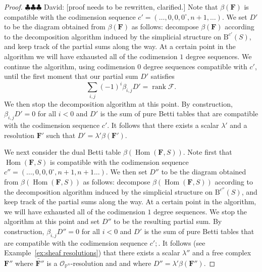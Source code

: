 \documentclass[12pt]{amsart}
\theoremstyle{definition}
\theoremstyle{remark}
\newcommand{\Hom}{\operatorname{Hom}} %
\newcommand{\rank}{\operatorname{rank}}
\newcommand{\PP}{\mathbb{P}}
\newcommand{\cc}{c}
\newcommand{\cO}{\mathcal{O}}
\newcommand{\cF}{\mathcal{F}}
\newcommand{\FF}{\mathbf{F}}
\newcommand{\zp}{\circ}
\newcommand{\BBQ}{\mathrm{B}}
\newcommand{\david}[1]{{\color{red} \sf $\clubsuit\clubsuit\clubsuit$ David: [#1]}}
\begin{document}
\begin{proof}\david{proof needs to be rewritten, clarified.}
Note that $\beta(\FF)$ is compatible with the codimension sequence $\cc'=(\dots,0,0,0^{\zp},n+1,\dots)$. We set $D'$ to be the diagram obtained from $\beta(\FF)$ as follows: decompose $\beta(\FF)$ according to the decomposition algorithm induced by the simplicial structure on $\BBQ^{\cc'}(S)$, and keep track of the partial sums along the way.  At a certain point in the algorithm we will have exhausted all of the codimension $1$ degree sequences.  We continue the algorithm, using codimension $0$ degree sequences compatible with $\cc'$, until the first moment that our partial sum $D'$ satisfies
\[
\sum_{i,j} (-1)^i\beta_{i,j}D'=\rank \cF.
\]
We then stop the decomposition algorithm at this point.  By construction, $\beta_{i,j}D'=0$ for all $i<0$ and $D'$ is the sum of pure Betti tables that are compatible with the codimension sequence $\cc'$.  It follows that there exists a scalar $\lambda'$ and a resolution $\FF'$ such that $D'=\lambda'\beta(\FF')$.

We next consider the dual Betti table $\beta(\Hom(\FF,S))$.  Note first that $\Hom(\FF,S)$ is compatible with the codimension sequence $\cc''=(\dots,0,0,0^{\zp},n+1,n+1\dots)$.  We then set $D''$ to be the diagram obtained from $\beta(\Hom(\FF,S))$ as follows: decompose $\beta(\Hom(\FF,S))$ according to the decomposition algorithm induced by the simplicial structure on $\BBQ^{\cc''}(S)$, and keep track of the partial sums along the way.  At a certain point in the algorithm, we will have exhausted all of the codimension $1$ degree sequences.  We stop the algorithm at this point and set $D''$ to be the resulting partial sum.
By construction, $\beta_{i,j}D''=0$ for all $i<0$ and $D'$ is the sum of pure Betti tables that are compatible with the codimension sequence $\cc';$.
It follows (see Example~\ref{ex:sheaf resolutions}) that there exists a scalar $\lambda''$ and a free complex $\FF''$ where $\widetilde{\FF''}$ is a $\cO_{\PP^n}$-resolution and and where $D''=\lambda'\beta(\FF'')$.


\end{proof}
\end{document}
